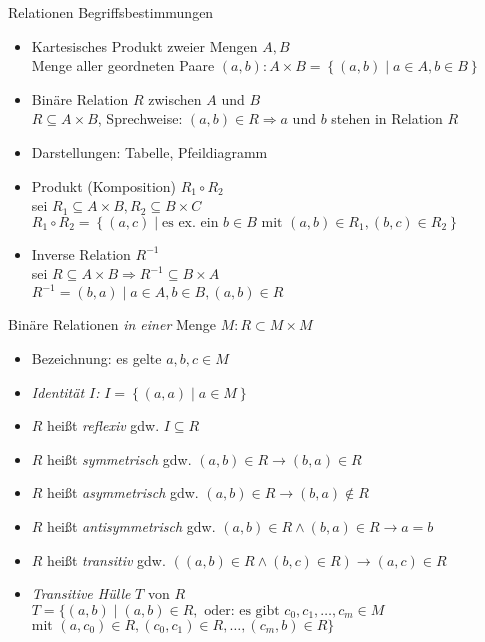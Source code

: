 \begin{frame}{Relationen}
	Begriffsbestimmungen
	\begin{itemize}
		\item Kartesisches Produkt zweier Mengen $A, B$\\
			Menge aller geordneten Paare $(a,b): A \times B = \left\{(a,b) \mid a \in A, b \in B\right\}$
		\item Binäre Relation $R$ zwischen $A$ und $B$\\
			$R \subseteq A \times B$, Sprechweise: $(a,b) \in R \Rightarrow a$ und $b$ stehen in Relation $R$
		\item Darstellungen: Tabelle, Pfeildiagramm
		\item Produkt (Komposition) $R_1 \circ R_2$\\
			sei $R_1 \subseteq A \times B, R_2 \subseteq B \times C$\\
			$R_1 \circ R_2 = \left\{(a,c) \mid \textrm{es ex. ein } b \in B \textrm{ mit } (a,b) \in R_1, (b,c) \in R_2\right\}$
		\item Inverse Relation $R^{-1}$\\
			sei $R \subseteq A \times B \Rightarrow R^{-1}\subseteq B \times A$\\
			$R^{-1}=(b,a) \mid a \in A, b \in B, (a,b) \in R$
	\end{itemize}
\end{frame}

\begin{frame}{Binäre Relationen \emph{in einer} Menge $M: R \subset M \times M$}
	\begin{itemize}
		\item Bezeichnung: es gelte $a,b,c \in M$
		\item \emph{Identität $I$:} $I=\left\{(a,a) \mid a \in M\right\}$
		\item $R$ heißt \emph{reflexiv} gdw. $I \subseteq R$
		\item $R$ heißt \emph{symmetrisch} gdw. $(a,b) \in R \rightarrow (b,a) \in R$
		\item $R$ heißt \emph{asymmetrisch} gdw. $(a,b) \in R \rightarrow (b,a) \notin R$
		\item $R$ heißt \emph{antisymmetrisch} gdw. $(a,b) \in R \land (b,a) \in R \rightarrow a = b$
		\item $R$ heißt \emph{transitiv} gdw. $((a,b) \in R \land (b,c) \in R) \rightarrow (a,c) \in R$
		\item \emph{Transitive Hülle} $T$ von $R$\\
			$T=\{(a,b) \mid (a,b) \in R, \textrm{ oder: es gibt } c_0, c_1, \ldots, c_m \in M$\\
			$\textrm{mit } (a,c_0) \in R, (c_0, c_1) \in R, \ldots, (c_m,b) \in R\}$
	\end{itemize}
\end{frame}

